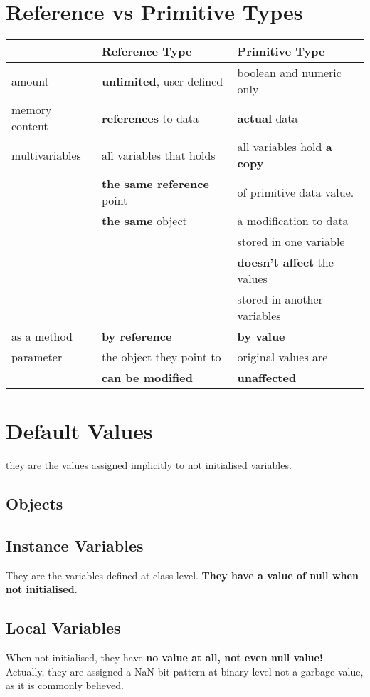 \documentclass{report}
\begin{document}
\section{Reference vs Primitive Types}
\begin{tabular}{l || l | l}
	& Reference Type & Primitive Type \\
	\hline
	amount & \textbf{unlimited}, user defined & boolean and numeric only \\
	\hline
	memory content & \textbf{references} to data & \textbf{actual} data \\
	\hline
	multivariables & all variables that holds  & all variables hold \textbf{a copy} \\
	& \textbf{the same reference} point & of primitive data value. \\
	& \textbf{the same} object & a modification to data\\
	& &stored   in one variable \\
	& & \textbf{doesn't affect} the values \\
	& & stored in another variables \\
	\hline
	as a method  & \textbf{by reference}& \textbf{by value}  \\
	parameter & the object they point to&original values are  \\
	& \textbf{can be modified}  & \textbf{unaffected} \\
	\hline
\end{tabular}


\section{Default Values}
they are the values assigned implicitly to not initialised variables.

\subsection{Objects}

\subsection*{Instance Variables}
They are the variables defined at class level. \textbf{They have a value of null when not initialised}.

\subsection*{Local Variables}
When not initialised, they have \textbf{no value at all, not even null value!}.
Actually, they are assigned a NaN bit pattern at binary level not a garbage value,
as it is commonly believed.
\end{document}
